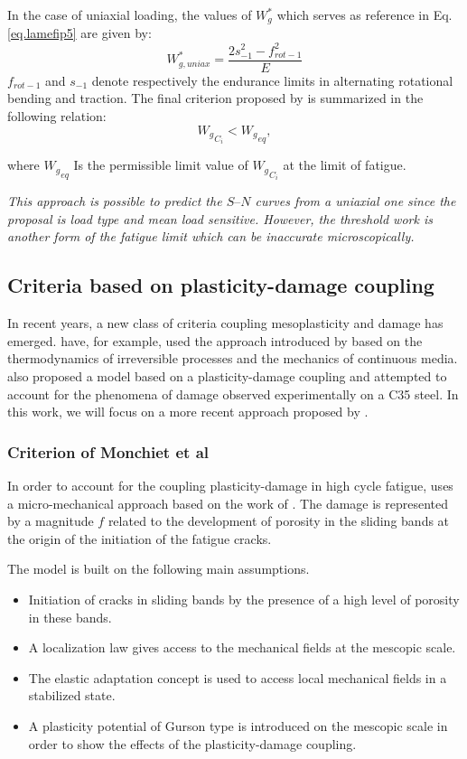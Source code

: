 In the case of uniaxial loading, the values of $W_g^*$ which serves as reference in Eq.\ref{eq.lamefip5} are given by:
$$W^*_{g,uniax}=\dfrac{2s_{-1}^2-f_{rot-1}^2}{E}$$
$f_{rot-1}$ and $s_{-1}$ denote respectively the endurance limits in alternating rotational bending and traction.
The final criterion proposed by \cite{banvillet2003volumetric} is summarized in the following relation:
$${W_g}_{C_i}<{W_g}_{eq},$$

where ${W_g}_{eq}$ Is the permissible limit value of ${W_g}_{C_i}$  at the limit of fatigue.

\textit{This approach is possible to predict the $S–N$ curves from
	a uniaxial one since the proposal is load type and mean
	load sensitive. However, the threshold work is another form of the fatigue limit which can be inaccurate microscopically.}

\subsection{Criteria based on plasticity-damage coupling}
In recent years, a new class of criteria coupling mesoplasticity and damage has emerged.  \cite{lemaitre1999two} have, for example, used the approach introduced by \cite{lemaitre1985mecanique} based on the thermodynamics of irreversible processes and the mechanics of continuous media.  \cite{flaceliere2004contribution} also proposed a model based on a plasticity-damage coupling and attempted to account for the phenomena of damage observed experimentally on a C35 steel. In this work, we will focus on a more recent approach proposed by \cite{monchiet2006contributions}.
\subsubsection{Criterion of Monchiet et al}
In order to account for the coupling plasticity-damage in high cycle fatigue, \cite{monchiet2006contributions} uses a micro-mechanical approach based on the work of  \cite{gurson1977continuum}. The damage is represented by a magnitude $f$ related to the development of porosity in the sliding bands at the origin of the initiation of the fatigue cracks. 

The model  is built on the following main assumptions. 

\begin{itemize}
	\item  Initiation of cracks in sliding bands by the presence of a high level of porosity in these bands.
	\item A localization law gives access to the mechanical fields at the mescopic scale.
	\item The elastic adaptation concept is used to access local mechanical fields in a stabilized state.
	\item A plasticity potential of Gurson type is introduced on the mescopic scale in order to show the effects of the plasticity-damage coupling.
\end{itemize}

